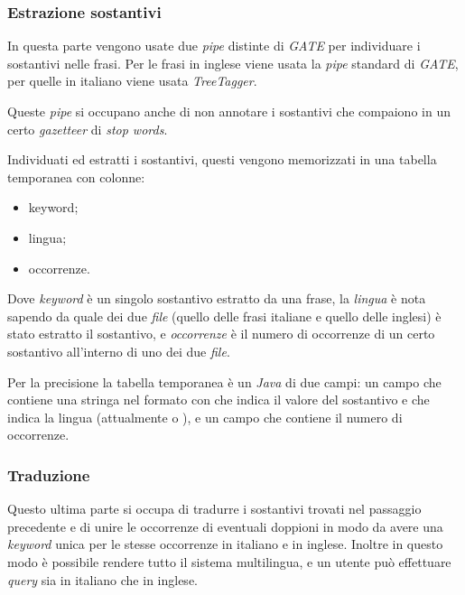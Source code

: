 \documentclass[tesi.tex]{subfiles}
\begin{document}
\subsubsection{Estrazione sostantivi}
 In questa parte vengono usate due \emph{pipe}
    distinte di \emph{GATE} per individuare i sostantivi nelle
    frasi. Per le frasi in inglese viene usata la \emph{pipe} standard
    di \emph{GATE}, per quelle in italiano viene usata
    \emph{TreeTagger}.

    Queste \emph{pipe} si occupano anche di non annotare i sostantivi
    che compaiono in un certo \emph{gazetteer} di \emph{stop words}.

    Individuati ed estratti i sostantivi, questi vengono memorizzati
    in una tabella temporanea con colonne:
    \begin{itemize}
    \item keyword;
    \item lingua;
    \item occorrenze.
    \end{itemize}
    Dove \emph{keyword} \`e un singolo sostantivo estratto da una
    frase, la \emph{lingua} \`e nota sapendo da quale
    dei due \emph{file} (quello delle frasi italiane e quello delle
    inglesi) \`e stato estratto il sostantivo, e \emph{occorrenze} \`e
    il numero di occorrenze di un certo sostantivo all'interno di uno
    dei due \emph{file}.

    Per la precisione la tabella temporanea \`e un 
    \emph{Java} di due campi: un campo  che contiene una
    stringa nel formato  con  che
    indica il valore
    del sostantivo e  che indica la lingua (attualmente
     o ), e un campo  che contiene il
    numero di occorrenze.
\subsubsection{Traduzione}
 Questo ultima parte si occupa di tradurre i
    sostantivi trovati nel passaggio precedente e di unire le occorrenze
    di eventuali doppioni in modo da avere una \emph{keyword} unica
    per le stesse occorrenze in italiano e in inglese. Inoltre in questo
    modo \`e possibile rendere tutto il sistema multilingua, e un
    utente pu\`o effettuare \emph{query} sia in italiano che in
    inglese.
\end{document}
